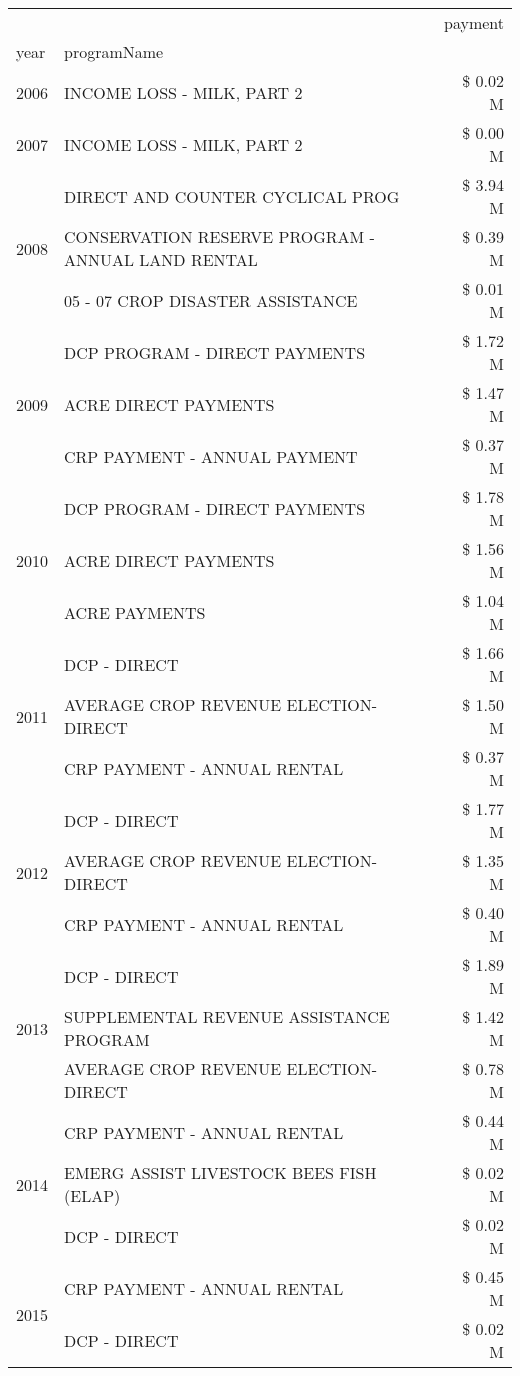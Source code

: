 \begin{tabular}{llr}
\toprule
 &  & payment \\
year & programName &  \\
\midrule
2006 & INCOME LOSS - MILK, PART 2 & \$ 0.02 M \\
\cline{1-3}
2007 & INCOME LOSS - MILK, PART 2 & \$ 0.00 M \\
\cline{1-3}
\multirow[t]{3}{*}{2008} & DIRECT AND COUNTER CYCLICAL PROG & \$ 3.94 M \\
 & CONSERVATION RESERVE PROGRAM - ANNUAL LAND RENTAL & \$ 0.39 M \\
 & 05 - 07 CROP DISASTER ASSISTANCE & \$ 0.01 M \\
\cline{1-3}
\multirow[t]{3}{*}{2009} & DCP PROGRAM - DIRECT PAYMENTS & \$ 1.72 M \\
 & ACRE DIRECT PAYMENTS & \$ 1.47 M \\
 & CRP PAYMENT - ANNUAL PAYMENT & \$ 0.37 M \\
\cline{1-3}
\multirow[t]{3}{*}{2010} & DCP PROGRAM - DIRECT PAYMENTS & \$ 1.78 M \\
 & ACRE DIRECT PAYMENTS & \$ 1.56 M \\
 & ACRE PAYMENTS & \$ 1.04 M \\
\cline{1-3}
\multirow[t]{3}{*}{2011} & DCP - DIRECT & \$ 1.66 M \\
 & AVERAGE CROP REVENUE ELECTION-DIRECT & \$ 1.50 M \\
 & CRP PAYMENT - ANNUAL RENTAL & \$ 0.37 M \\
\cline{1-3}
\multirow[t]{3}{*}{2012} & DCP - DIRECT & \$ 1.77 M \\
 & AVERAGE CROP REVENUE ELECTION-DIRECT & \$ 1.35 M \\
 & CRP PAYMENT - ANNUAL RENTAL & \$ 0.40 M \\
\cline{1-3}
\multirow[t]{3}{*}{2013} & DCP - DIRECT & \$ 1.89 M \\
 & SUPPLEMENTAL REVENUE ASSISTANCE PROGRAM & \$ 1.42 M \\
 & AVERAGE CROP REVENUE ELECTION-DIRECT & \$ 0.78 M \\
\cline{1-3}
\multirow[t]{3}{*}{2014} & CRP PAYMENT - ANNUAL RENTAL & \$ 0.44 M \\
 & EMERG ASSIST LIVESTOCK BEES FISH (ELAP) & \$ 0.02 M \\
 & DCP - DIRECT & \$ 0.02 M \\
\cline{1-3}
\multirow[t]{3}{*}{2015} & CRP PAYMENT - ANNUAL RENTAL & \$ 0.45 M \\
 & DCP - DIRECT & \$ 0.02 M \\

\end{tabular}
